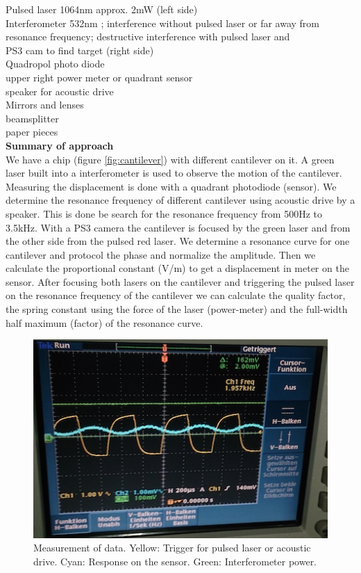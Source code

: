 \documentclass[12pt,a4paper]{article}
\begin{document}
\begin{multicols}{2}
\noindent
Pulsed laser 1064nm approx. 2mW (left side)\\
Interferometer 532nm ; interference without pulsed laser or far away from resonance frequency; destructive interference with pulsed laser and\\
PS3 cam to find target (right side)\\
Quadropol photo diode\\
upper right power meter or quadrant sensor\\
speaker for acoustic drive \\
Mirrors and lenses\\
beamsplitter\\
paper pieces\\

\textbf{Summary of approach}\\
We have a chip (figure \ref{fig:cantilever}) with different cantilever on it. A green laser built into a interferometer is used to observe the motion of the cantilever. Measuring the displacement is done with a quadrant photodiode (sensor). We determine the resonance frequency of different cantilever using acoustic drive by a speaker. This is done be search for the resonance frequency from 500Hz to 3.5kHz. With a PS3 camera the cantilever is focused by the green laser and from the other side from the pulsed red laser. We determine a resonance curve for one cantilever and protocol the phase and normalize the amplitude. Then we calculate the proportional constant (V/m) to get a displacement in meter on the sensor. After focusing both lasers on the cantilever and triggering the pulsed laser on the resonance frequency of the cantilever we can calculate the quality factor, the spring constant using the force of the laser (power-meter) and the full-width half maximum (\gamma factor) of the resonance curve.

\begin{figure}[H]
	\centering
	\includegraphics[scale=0.5]{../figures/messung.png}
	\caption{Measurement of data. Yellow:  Trigger for pulsed laser or acoustic drive. Cyan: Response on the sensor. Green: Interferometer power.}
	\label{fig:measurement}
\end{figure}


\end{multicols}
\end{document}
